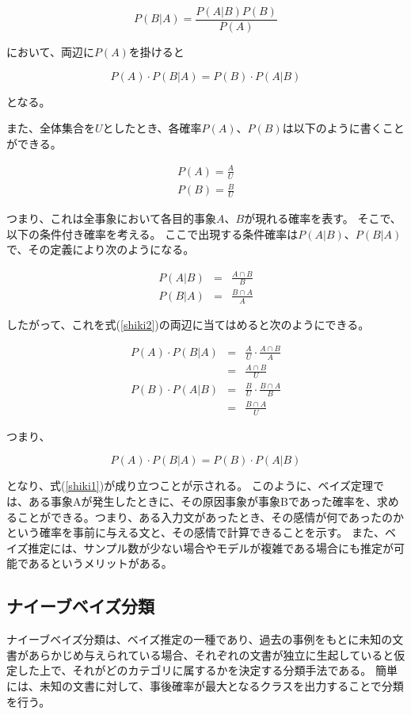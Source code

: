 \documentclass[11pt,a4j]{jsarticle}
\begin{document}
\begin{equation}
P(B|A)=\frac{P(A|B)P(B)}{P(A)}
\label{shiki1}
\end{equation}

において、両辺に$P(A)$を掛けると

\begin{equation}
  P(A) \cdot P(B|A)=P(B) \cdot P(A|B) \label{shiki2}
\end{equation}

となる。

また、全体集合を$U$としたとき、各確率$P(A)$、$P(B)$は以下のように書くことができる。

\begin{eqnarray*}
P(A) = \frac{A}{U}\\
P(B) = \frac{B}{U}
\end{eqnarray*}

つまり、これは全事象において各目的事象$A$、$B$が現れる確率を表す。
そこで、以下の条件付き確率を考える。
ここで出現する条件確率は$P(A|B)$、$P(B|A)$で、その定義により次のようになる。

\begin{eqnarray*}
P(A|B) & = & \frac{A \cap B}{B}\\
P(B|A) & = & \frac{B \cap A}{A}
\end{eqnarray*}

したがって、これを式(\ref{shiki2})の両辺に当てはめると次のようにできる。

\begin{eqnarray*}
P(A) \cdot P(B|A) & = & \frac{A}{U} \cdot \frac{A \cap B}{A}\\
               & = & \frac{A \cap B}{U}\\
P(B) \cdot P(A|B)  & = &\frac{B}{U} \cdot \frac{B \cap A}{B}\\
                  & = & \frac{B \cap A}{U}
\end{eqnarray*}

つまり、

\[ P(A) \cdot P(B|A)=P(B) \cdot P(A|B) \]

となり、式(\ref{shiki1})が成り立つことが示される。
このように、ベイズ定理では、ある事象Aが発生したときに、その原因事象が事象Bであった確率を、求めることができる。つまり、ある入力文があったとき、その感情が何であったのかという確率を事前に与える文と、その感情で計算できることを示す。
また、ベイズ推定には、サンプル数が少ない場合やモデルが複雑である場合にも推定が可能であるというメリットがある。

 \subsection{ナイーブベイズ分類}\label{sec:defnaivebayes}
ナイーブベイズ分類は、ベイズ推定の一種であり、過去の事例をもとに未知の文書があらかじめ与えられている場合、それぞれの文書が独立に生起していると仮定した上で、それがどのカテゴリに属するかを決定する分類手法である。
簡単には、未知の文書に対して、事後確率が最大となるクラスを出力することで分類を行う。
\end{document}
